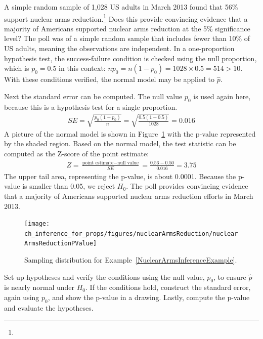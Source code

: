 \begin{example}{A simple random sample of 1,028 US adults in March 2013 found that 56\% support nuclear arms reduction.\footnote{} Does this provide convincing evidence that a majority of Americans supported nuclear arms reduction at the 5\% significance level?} \label{NuclearArmsInferenceExample}
The poll was of a simple random sample that includes fewer than 10\% of US adults, meaning the observations are independent. In a one-proportion hypothesis test, the success-failure condition is checked using the null proportion, which is $p_0 = 0.5$ in this context: $n p_0 = n (1 - p_0) = 1028 \times 0.5 = 514 > 10$. With these conditions verified, the normal model may be applied to $\hat{p}$.

Next the standard error can be computed. The null value $p_0$ is used again here, because this is a hypothesis test for a single proportion.
\begin{align*}
SE = \sqrt{\frac{p_0 (1 - p_0)}{n}} = \sqrt{\frac{0.5 (1 - 0.5)}{1028}} = 0.016
\end{align*}
A picture of the normal model is shown in Figure~\ref{nuclearArmsReductionPValue} with the p-value represented by the shaded region. Based on the normal model, the test statistic can be computed as the Z-score of the point estimate:
\begin{align*}
Z = \frac{\text{point estimate} - \text{null value}}{SE} = \frac{0.56 - 0.50}{0.016} = 3.75
\end{align*}
The upper tail area, representing the p-value, is about 0.0001. Because the p-value is smaller than 0.05, we reject $H_0$. The poll provides convincing evidence that a majority of Americans supported nuclear arms reduction efforts in March 2013.
\end{example}

\begin{figure}[h]
\centering
\texttt{[image: ch\_inference\_for\_props/figures/nuclearArmsReduction/nuclearArmsReductionPValue]}
\caption{Sampling distribution for Example~\ref{NuclearArmsInferenceExample}.}
\label{nuclearArmsReductionPValue}
\end{figure}

\begin{termBox}{
Set up hypotheses and verify the conditions using the null value, $p_0$, to ensure $\hat{p}$ is nearly normal under $H_0$. If the conditions hold, construct the standard error, again using $p_0$, and show the p-value in a drawing. Lastly, compute the p-value and evaluate the hypotheses.}
\end{termBox}

